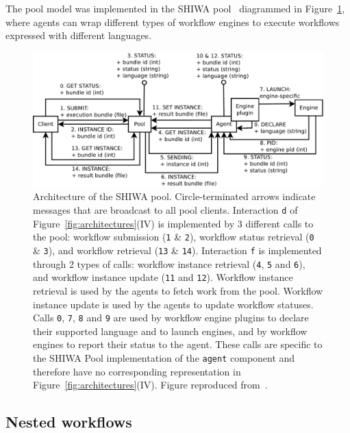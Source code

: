 \documentclass[preprint,3p,twocolumn]{elsarticle}
\begin{document}
The pool model was implemented in the SHIWA pool~\cite{ROGE-13}
diagrammed in Figure~\ref{fig:shiwa-pool-architecture}, where agents
can wrap different types of workflow engines to execute workflows
expressed with different languages.



\begin{figure}
\centering
\includegraphics[width=1.5\columnwidth]{figures/pool-interactions.pdf}
\caption{Architecture of the SHIWA pool. Circle-terminated arrows
  indicate messages that are broadcast to all pool
  clients. Interaction \texttt{d} of Figure~\ref{fig:architectures}(IV) is
  implemented by 3 different calls to the pool: workflow
  submission (\texttt{1} \& \texttt{2}), workflow status retrieval
  (\texttt{0} \& \texttt{3}), and workflow
  retrieval (\texttt{13} \& \texttt{14}). Interaction
  \texttt{f} is implemented through 2 types of calls: workflow
  instance retrieval (\texttt{4}, \texttt{5} and \texttt{6}), and
  workflow instance update (\texttt{11} and \texttt{12}). Workflow
  instance retrieval is used by the agents to fetch work from the
  pool. Workflow instance update is used by the agents to update
  workflow statuses.  Calls \texttt{0}, \texttt{7}, \texttt{8} and
  \texttt{9} are used by
  workflow engine plugins to declare their supported language and to
  launch engines, and by workflow engines to report their status to
  the agent. These calls are specific to the SHIWA Pool implementation
  of the \texttt{agent} component and therefore have no corresponding
  representation in Figure~\ref{fig:architectures}(IV). Figure reproduced
  from~\cite{ROGE-13}.}
\label{fig:shiwa-pool-architecture}
\end{figure}


\subsection{Nested workflows}
\end{document}
